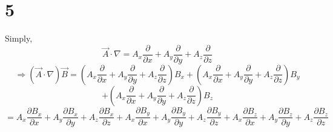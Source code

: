 \documentclass[letterpaper, 11pt]{article}
\begin{document}
\section*{5}
Simply,
\[\vec{A}\cdot \nabla=A_x\frac{\partial}{\partial x} + A_y\frac{\partial}{\partial y}+A_z\frac{\partial}{\partial z}\]\[\Rightarrow (\vec{A}\cdot\nabla)\vec{B}=\left(A_x\frac{\partial}{\partial x} + A_y\frac{\partial}{\partial y}+A_z\frac{\partial}{\partial z}\right)B_x+\left(A_x\frac{\partial}{\partial x} + A_y\frac{\partial}{\partial y}+A_z\frac{\partial}{\partial z}\right)B_y\]\[+\left(A_x\frac{\partial}{\partial x} + A_y\frac{\partial}{\partial y}+A_z\frac{\partial}{\partial z}\right)B_z\]\[=A_x\frac{\partial B_x}{\partial x} + A_y\frac{\partial B_x}{\partial y} + A_z\frac{\partial B_x}{\partial z}+A_x\frac{\partial B_y}{\partial x}+A_y\frac{\partial B_y}{\partial y}+A_z\frac{\partial B_y}{\partial z}+A_x\frac{\partial B_z}{\partial x}+A_y\frac{\partial B_z}{\partial y}+A_z\frac{\partial B_z}{\partial z}\]
\end{document}
